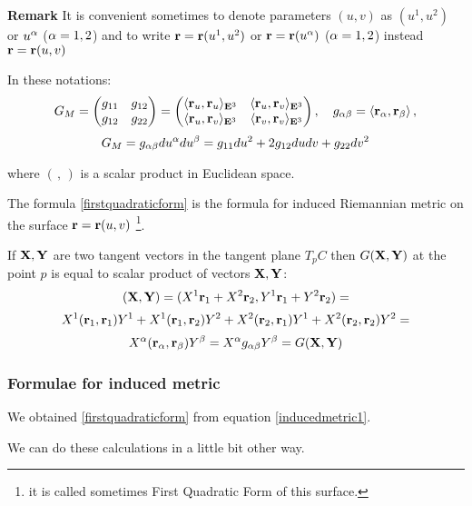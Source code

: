 \documentclass[12pt]{article}
\theoremstyle{theorem}
\numberwithin{equation}{section}
\begin{document}
  {\bf Remark}   It is convenient sometimes to denote
    parameters $(u,v)$ as $(u^1,u^2)$ or $u^\alpha$ ($\alpha=1,2$)
   and to write ${\bf r}={\bf r}(u^1,u^2)$ or ${\bf r}={\bf r}(u^\alpha)$ ($\alpha=1,2$)
   instead ${\bf r}={\bf r}(u,v)$

In these notations:
\begin{equation*}
    G_M=
\begin{pmatrix}
   g_{11} & g_{12} \\
   g_{12}& g_{22} \\
   \end{pmatrix}=
   \begin{pmatrix}
   \langle{\bf r}_u,{\bf r}_u\rangle_{{\bf E}^3} & \langle{\bf r}_u,{\bf r}_v\rangle_{{\bf E}^3} \\
   \langle{\bf r}_u,{\bf r}_v\rangle_{{\bf E}^3} & \langle{\bf r}_v,{\bf r}_v\rangle_{{\bf E}^3} \\
   \end{pmatrix},\quad g_{\alpha\beta}=\langle{\bf r}_\alpha,{\bf r}_\beta\rangle\,,
\end{equation*}
             \begin{equation}\label{firstquadraticform}
          G_M=g_{\alpha\beta}du^\alpha du^\beta=g_{11}du^2+2g_{12}dudv+g_{22}dv^2
             \end{equation}

where $(\,,\,)$ is a scalar product in Euclidean space.


The formula \eqref{firstquadraticform} 
is the formula for induced Riemannian
metric on the surface ${\bf r}={\bf r}(u,v)$ \footnote {
it is called sometimes First Quadratic Form of this surface.}.

  If ${{\bf X},{\bf Y}}$ are two tangent vectors in the 
tangent plane $T_pC$ then $G({\bf X},{\bf Y})$
  at the point $p$ is equal to scalar product of vectors ${\bf X},{\bf Y}$:
\begin{equation}\label{scalarproduct}
({\bf X},{\bf Y})=(X^1{\bf r}_1+X^2{\bf r}_2, Y^1{\bf r}_1+Y^2{\bf r}_2)=
\end{equation}
                $$
X^1 ({\bf r}_1,{\bf r}_1)Y^1+X^1 ({\bf r}_1,{\bf r}_2)Y^2+X^2 ({\bf r}_2,{\bf r}_1)Y^1+X^2 ({\bf r}_2,{\bf r}_2)Y^2=
$$
$$X^\alpha ({\bf r}_\alpha,{\bf r}_\beta)Y^\beta=
X^\alpha g_{\alpha\beta}Y^\beta=G({\bf X},{\bf Y})
$$



\subsubsection{Formulae for induced metric}
\label{formulaeforembeddingsurfaces}

We obtained \eqref{firstquadraticform}
from equation  \eqref{inducedmetric1}.

 We can do these calculations in a 
little bit other way. 
\end{document}
